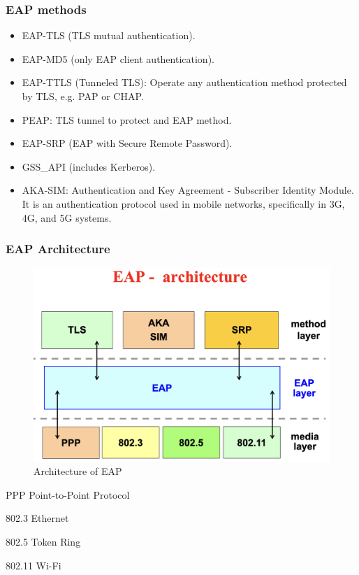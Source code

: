 \subsubsection{EAP methods}

\begin{itemize}
    \item EAP-TLS (TLS mutual authentication).
    \item EAP-MD5 (only EAP client authentication).
    \item EAP-TTLS (Tunneled TLS): Operate any authentication method protected by TLS, e.g. PAP or CHAP.
    \item PEAP: TLS tunnel to protect and EAP method.
    \item EAP-SRP (EAP with Secure Remote Password).
    \item GSS\_API (includes Kerberos).
    \item AKA-SIM: Authentication and Key Agreement - Subscriber Identity Module. It is an authentication protocol used in mobile networks, specifically in 3G, 4G, and 5G systems.
\end{itemize}

\subsubsection{EAP Architecture}

\begin{figure}[H]
    \includegraphics[width=\linewidth]{Images/NetSec/eapArchitecture.png}
    \caption{Architecture of EAP}
\end{figure}

\begin{tcolorbox}[colback=blue!10!white, colframe=blue!50!white, title=Essentials of link-layer protocols] 
PPP \textrightarrow Point-to-Point Protocol

802.3 \textrightarrow Ethernet

802.5 \textrightarrow Token Ring

802.11 \textrightarrow Wi-Fi
\end{tcolorbox}

